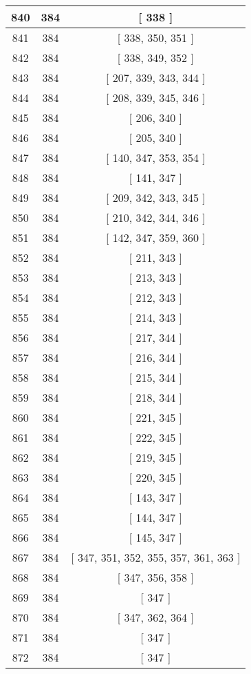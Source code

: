 \begin{center}
\begin{longtable}[H]{|| c c c ||}
\hline
840 & 384 & [ 338 ] \\ 
\hline
841 & 384 & [ 338, 350, 351 ] \\ 
\hline
842 & 384 & [ 338, 349, 352 ] \\ 
\hline
843 & 384 & [ 207, 339, 343, 344 ] \\ 
\hline
844 & 384 & [ 208, 339, 345, 346 ] \\ 
\hline
845 & 384 & [ 206, 340 ] \\ 
\hline
846 & 384 & [ 205, 340 ] \\ 
\hline
847 & 384 & [ 140, 347, 353, 354 ] \\ 
\hline
848 & 384 & [ 141, 347 ] \\ 
\hline
849 & 384 & [ 209, 342, 343, 345 ] \\ 
\hline
850 & 384 & [ 210, 342, 344, 346 ] \\ 
\hline
851 & 384 & [ 142, 347, 359, 360 ] \\ 
\hline
852 & 384 & [ 211, 343 ] \\ 
\hline
853 & 384 & [ 213, 343 ] \\ 
\hline
854 & 384 & [ 212, 343 ] \\ 
\hline
855 & 384 & [ 214, 343 ] \\ 
\hline
856 & 384 & [ 217, 344 ] \\ 
\hline
857 & 384 & [ 216, 344 ] \\ 
\hline
858 & 384 & [ 215, 344 ] \\ 
\hline
859 & 384 & [ 218, 344 ] \\ 
\hline
860 & 384 & [ 221, 345 ] \\ 
\hline
861 & 384 & [ 222, 345 ] \\ 
\hline
862 & 384 & [ 219, 345 ] \\ 
\hline
863 & 384 & [ 220, 345 ] \\ 
\hline
864 & 384 & [ 143, 347 ] \\ 
\hline
865 & 384 & [ 144, 347 ] \\ 
\hline
866 & 384 & [ 145, 347 ] \\ 
\hline
867 & 384 & [ 347, 351, 352, 355, 357, 361, 363 ] \\ 
\hline
868 & 384 & [ 347, 356, 358 ] \\ 
\hline
869 & 384 & [ 347 ] \\ 
\hline
870 & 384 & [ 347, 362, 364 ] \\ 
\hline
871 & 384 & [ 347 ] \\ 
\hline
872 & 384 & [ 347 ] \\ 
\hline

\end{longtable}
\end{center}
